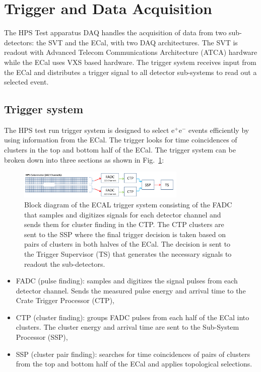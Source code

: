 \documentclass[final,3p,times,twocolumn]{elsarticle}
\newcommand{\ee}{e$^+$e$^-$}
\begin{document}
\section{Trigger and Data Acquisition}

The HPS Test apparatus DAQ handles the acquisition of data from two sub-detectors: the 
SVT and the ECal, with two DAQ architectures. The SVT is readout with Advanced 
Telecom Communications Architecture (ATCA) hardware while the ECal uses VXS based 
hardware. The trigger system receives input from the ECal and distributes a trigger signal 
to all detector sub-systems to read out a selected event. 

\subsection{Trigger system}
\label{sec:trigger}

The HPS test run trigger system is designed to select \ee{} events efficiently by 
using information from the ECal. The trigger looks for time coincidences of clusters in the top and bottom 
half of the ECal. The trigger system can be broken down into three sections as shown in 
Fig.~\ref{fig:hps_trigger_cal}:
 \begin{figure}[b]
\begin{center}
{\small
 \includegraphics[width=8cm]{figures/hps_trigger_cal}
\caption{Block diagram of the ECAL trigger system consisting of the FADC that samples and digitizes 
signals for each detector channel and sends them for cluster finding in the CTP. The CTP clusters are 
sent to the SSP where the final trigger decision is taken based on pairs of clusters in both halves of the 
ECal. The decision is sent to the Trigger Supervisor (TS) that generates the necessary signals to readout 
the sub-detectors.}
 \label{fig:hps_trigger_cal}
}
\end{center}
 \end{figure}
 \begin{itemize}
 \item FADC (pulse finding): samples and digitizes the signal pulses from each detector channel. 
Sends the measured pulse energy and arrival time to the Crate Trigger Processor (CTP),
\item CTP (cluster finding): groups FADC pulses from each half of the ECal into clusters. 
The cluster energy and arrival time are sent to the Sub-System Processor (SSP),
 \item SSP (cluster pair finding): searches for time coincidences of pairs of clusters from 
the top and bottom half of the ECal and applies topological selections.
 \end{itemize}
\end{document}
